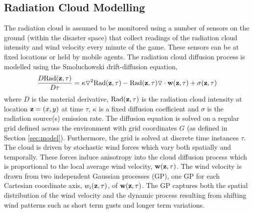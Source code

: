 \subsection{Radiation Cloud Modelling}\label{sec:radiation}
\noindent The radiation cloud is assumed to be monitored using a number of sensors on the ground (within the disaster space) that collect readings of the radiation cloud intensity and wind velocity every minute of the game. These sensors can be at fixed locations or held by mobile agents.  The radiation cloud diffusion process is modelled using the Smoluchowski drift-diffusion equation, 
\begin{eqnarray*}
\frac{D \text{Rad}({\bf z}, \tau)}{D \tau}=\kappa \triangledown^2 \text{Rad}({\bf z},\tau)-\text{Rad}({\bf z},\tau)\triangledown \cdot {\bf w}({\bf z},\tau)+\sigma({\bf z},\tau)
\end{eqnarray*}
where $D$ is the material derivative, $\text{Rad}({\bf z},\tau)$ is the radiation cloud intensity at location ${\bf z}=(x,y)$ at time $\tau$, $\kappa$ is a fixed diffusion coefficient and $\sigma$ is the radiation source(s) emission rate. The diffusion equation is solved on a regular grid defined across the environment with grid coordinates $G$ (as defined in Section \ref{sec:model}).  Furthermore, the grid is solved at discrete time instances $\tau$.  The cloud is driven by stochastic wind forces which vary both spatially and temporally.  These forces induce anisotropy into the cloud diffusion process which is proportional to the local average wind velocity, ${\bf w}({\bf z},\tau)$.  The wind velocity is drawn from two independent Gaussian processes (GP), one GP for each Cartesian coordinate axis, $w_i({\bf z},\tau)$, of ${\bf w}({\bf z},\tau)$.  The GP captures both the spatial distribution of the wind velocity and the dynamic process resulting from shifting wind patterns such as short term gusts and longer term variations. 


